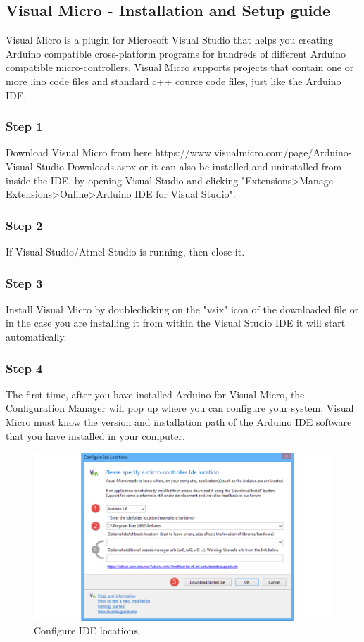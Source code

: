 \begin{refsection}
	\subsection{Visual Micro - Installation and Setup guide}
	Visual Micro is a plugin for Microsoft Visual Studio that helps you creating Arduino compatible cross-platform programs for hundreds of different Arduino compatible micro-controllers. Visual Micro supports projects that contain one or more .ino code files and standard c++ cource code files, just like the Arduino IDE.
	
	
	\subsubsection{Step 1}
	Download Visual Micro from here https://www.visualmicro.com/page/Arduino-Visual-Studio-Downloads.aspx or it can also be installed and uninstalled from inside the IDE, by opening Visual Studio and clicking "Extensions>Manage Extensions>Online>Arduino IDE for Visual Studio".
	
	\subsubsection{Step 2}
	If Visual Studio/Atmel Studio is running, then close it.
	
	\subsubsection{Step 3}
	Install Visual Micro by doubleclicking on the "vsix" icon of the downloaded file or in the case you are installing it from within the Visual Studio IDE it will start automatically.
	
	\subsubsection{Step 4}
	
	The first time, after you have installed Arduino for Visual Micro, the Configuration Manager will pop up where you can configure your system. Visual Micro must know the version and installation path of the Arduino IDE software that you have installed in your computer.
	
	\begin{figure}[H]
		\centering
		\includegraphics[width=1\linewidth]{./sdf/arduino_quantum_rx/figures/configureIDE.pdf}
		\caption{Configure IDE locations.}
		\label{configureIDE}
	\end{figure}
	

\end{refsection}
